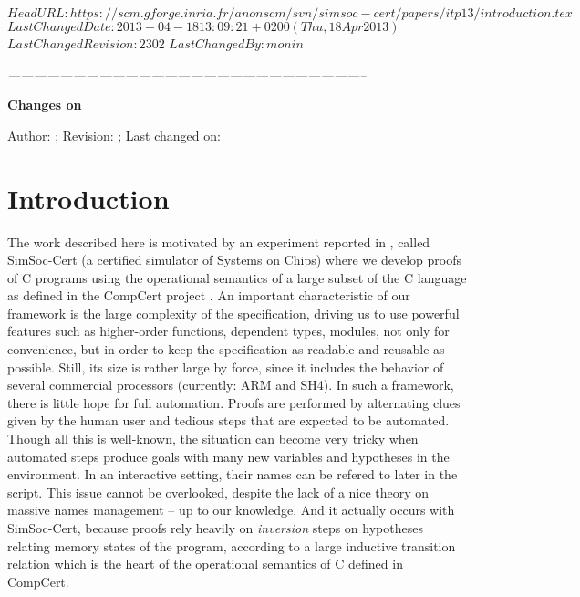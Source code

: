 \svnidlong
{$HeadURL: https://scm.gforge.inria.fr/anonscm/svn/simsoc-cert/papers/itp13/introduction.tex $}
{$LastChangedDate: 2013-04-18 13:09:21 +0200 (Thu, 18 Apr 2013) $}
{$LastChangedRevision: 2302 $}
{$LastChangedBy: monin $}


\begin{thoughts}
\itshape
\hfil -----------------------------------------------------------------------------------\par
\hfil \textbf{Changes on \currfilename}

Author: \svnfileauthor; Revision: \svnfilerev; Last changed on: \svnfiledate
\end{thoughts}


\section{Introduction}
\label{sec:intro}


The work described here is motivated by an experiment reported in \cite{rapido11,cpp11},
called SimSoc-Cert (a certified simulator of Systems on Chips)
where we develop proofs of C programs using the operational semantics of
a large subset of the C language as defined in the CompCert %
project \cite{Leroy-Compcert-CACM}.
An important characteristic of our framework is 
the large complexity of the specification,
driving us to use powerful features such as higher-order functions,
dependent types, modules,
not only for convenience, 
but in order to keep the specification as readable and reusable as possible.
Still, its size is rather large by force, since it includes the behavior of 
several commercial processors (currently: ARM and SH4).
In such a framework, 
there is little hope for full automation.
Proofs are performed by alternating clues given by the human user 
and tedious steps that are expected to be automated.
Though all this is well-known, 
the situation can become very tricky when automated steps 
produce goals with many new variables and hypotheses in the environment. 
In an interactive setting, their names can be refered to later
in the script.
This issue cannot be overlooked,
despite the lack of a nice theory on massive names management
-- up to our knowledge.
And it actually occurs with SimSoc-Cert,
because proofs rely heavily on \emph{inversion} steps on 
hypotheses relating memory states of the program,
according to a large inductive transition relation 
which is the heart of the operational semantics of C defined in CompCert.

